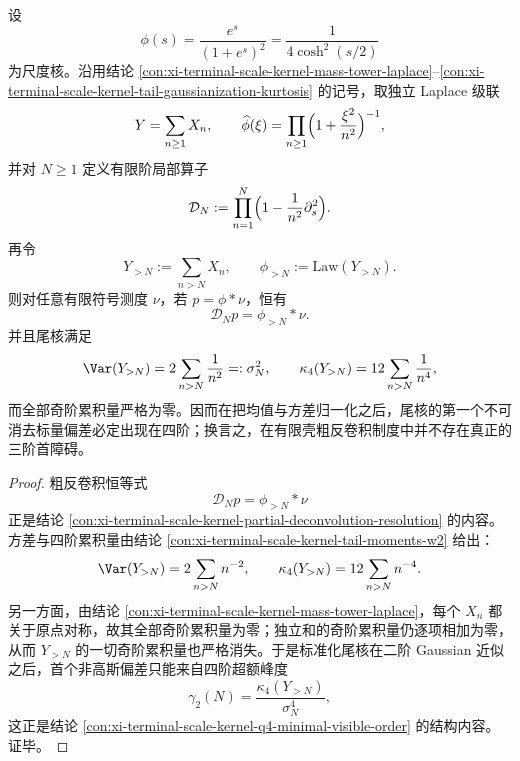 \begin{theorem}[有限壳粗反卷积后的四阶首障碍]\label{thm:conclusion-scalekernel-finite-shell-fourth-order-obstruction}
设
\[
\phi(s)=\frac{e^s}{(1+e^s)^2}=\frac{1}{4\cosh^2(s/2)}
\]
为尺度核。沿用结论 \ref{con:xi-terminal-scale-kernel-mass-tower-laplace}--\ref{con:xi-terminal-scale-kernel-tail-gaussianization-kurtosis} 的记号，取独立 Laplace 级联
\[
Y=\sum_{n\ge 1}X_n,
\qquad
\widehat\phi(\xi)=\prod_{n\ge 1}\Bigl(1+\frac{\xi^2}{n^2}\Bigr)^{-1},
\]
并对 \(N\ge 1\) 定义有限阶局部算子
\[
\mathcal D_N:=\prod_{n=1}^{N}\Bigl(1-\frac{1}{n^2}\partial_s^2\Bigr).
\]
再令
\[
Y_{>N}:=\sum_{n>N}X_n,
\qquad
\phi_{>N}:=\mathrm{Law}(Y_{>N}).
\]
则对任意有限符号测度 \(\nu\)，若 \(p=\phi*\nu\)，恒有
\[
\mathcal D_N p=\phi_{>N}*\nu.
\]
并且尾核满足
\[
\Var(Y_{>N})=2\sum_{n>N}\frac{1}{n^2}=: \sigma_N^2,
\qquad
\kappa_4(Y_{>N})=12\sum_{n>N}\frac{1}{n^4},
\]
而全部奇阶累积量严格为零。因而在把均值与方差归一化之后，尾核的第一个不可消去标量偏差必定出现在四阶；换言之，在有限壳粗反卷积制度中并不存在真正的三阶首障碍。
\end{theorem}
\begin{proof}
粗反卷积恒等式
\[
\mathcal D_N p=\phi_{>N}*\nu
\]
正是结论 \ref{con:xi-terminal-scale-kernel-partial-deconvolution-resolution} 的内容。方差与四阶累积量由结论 \ref{con:xi-terminal-scale-kernel-tail-moments-w2} 给出：
\[
\Var(Y_{>N})=2\sum_{n>N}n^{-2},
\qquad
\kappa_4(Y_{>N})=12\sum_{n>N}n^{-4}.
\]
另一方面，由结论 \ref{con:xi-terminal-scale-kernel-mass-tower-laplace}，每个 \(X_n\) 都关于原点对称，故其全部奇阶累积量为零；独立和的奇阶累积量仍逐项相加为零，从而 \(Y_{>N}\) 的一切奇阶累积量也严格消失。于是标准化尾核在二阶 Gaussian 近似之后，首个非高斯偏差只能来自四阶超额峰度
\[
\gamma_2(N)=\frac{\kappa_4(Y_{>N})}{\sigma_N^4},
\]
这正是结论 \ref{con:xi-terminal-scale-kernel-q4-minimal-visible-order} 的结构内容。证毕。
\end{proof}

